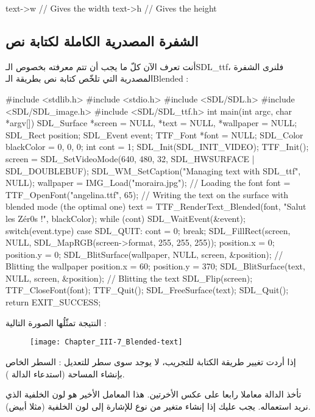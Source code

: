 \begin{Csource}
text->w // Gives the width
text->h // Gives the height
\end{Csource}

\subsection{الشفرة المصدرية الكاملة لكتابة نص}

أنت تعرف الآن كلّ ما يجب أن تتم معرفته بخصوص الـ\textenglish{SDL\_ttf}،
فلنرى الشفرة المصدرية التي تلخّص كتابة نص بطريقة الـ\textenglish{Blended} :

\begin{Csource}
#include <stdlib.h>
#include <stdio.h>
#include <SDL/SDL.h>
#include <SDL/SDL_image.h>
#include <SDL/SDL_ttf.h>
int main(int argc, char *argv[])
{
	SDL_Surface *screen = NULL, *text = NULL, *wallpaper = NULL;
	SDL_Rect position;
	SDL_Event event;
	TTF_Font *font = NULL;
	SDL_Color blackColor = {0, 0, 0};
	int cont = 1;
	SDL_Init(SDL_INIT_VIDEO);
	TTF_Init();	
	screen = SDL_SetVideoMode(640, 480, 32, SDL_HWSURFACE | SDL_DOUBLEBUF);
	SDL_WM_SetCaption("Managing text with SDL_ttf", NULL);
	wallpaper = IMG_Load("moraira.jpg");
	// Loading the font 
	font = TTF_OpenFont("angelina.ttf", 65);
	// Writing the text on the surface with blended mode (the optimal one)
	text = TTF_RenderText_Blended(font, "Salut les Zér0s !", blackColor);
	while (cont)	
	{
		SDL_WaitEvent(&event);
		switch(event.type)
		{
			case SDL_QUIT:
			cont = 0;
			break;
		}
		SDL_FillRect(screen, NULL, SDL_MapRGB(screen->format, 255, 255, 255));
		position.x = 0;
		position.y = 0;
		SDL_BlitSurface(wallpaper, NULL, screen, &position); // Blitting the wallpaper
		position.x = 60;
		position.y = 370;
		SDL_BlitSurface(text, NULL, screen, &position); // Blitting the text
		SDL_Flip(screen);
	}
	TTF_CloseFont(font);
	TTF_Quit();
	SDL_FreeSurface(text);
	SDL_Quit();
	return EXIT_SUCCESS;
}
\end{Csource}

النتيجة تمثّلُها الصورة التالية :

\begin{figure}[H]
	\centering
	\texttt{[image: Chapter\_III-7\_Blended-text]}
\end{figure}

إذا أردت تغيير طريقة الكتابة للتجريب، لا يوجد سوى سطر للتعديل : السطر الخاص بإنشاء المساحة (استدعاء الدالة 
).

\begin{warning}
تأخذ الدالة
معاملا رابعا على عكس الأخرتين. هذا المعامل الأخير هو لون الخلفية الذي نريد استعماله. يجب عليك إذا إنشاء متغير من نوع
للإشارة إلى لون الخلفية (مثلا أبيض).
\end{warning}

